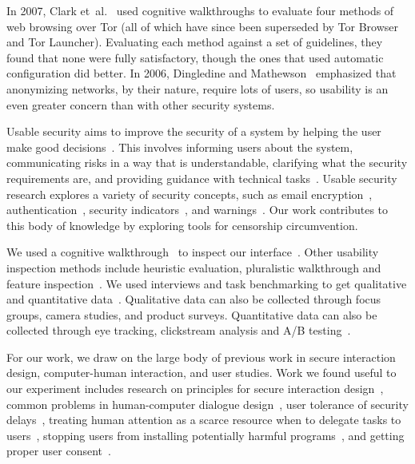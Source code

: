 \documentclass[USenglish,oneside,twocolumn]{article}
\begin{document}
In 2007, Clark et~al.~\cite{clark2007usability}
used cognitive walkthroughs to evaluate four
methods of web browsing over Tor
(all of which have since been superseded by Tor Browser and Tor Launcher).
Evaluating each method against a set of guidelines,
they found that none were fully satisfactory,
though the ones that used automatic configuration did better.
In 2006, Dingledine and Mathewson~\cite{dingledine2006anonymity}
emphasized that anonymizing networks, by their nature,
require lots of users, so usability is an even greater concern
than with other security systems.

Usable security aims to improve the security of a system by helping the user make good decisions~\cite{payne2008brief}. This involves informing users about the system, communicating risks in a way that is understandable, clarifying what the security requirements are, and providing guidance with technical tasks~\cite{adams1999users}. Usable security research explores a variety of security concepts, such as email encryption~\cite{whitten1999johnny,garfinkel2005johnny}, authentication~\cite{morris1979password,dhamija2000deja,suo2005graphical}, security indicators~\cite{dhamija2006phishing,akhawe2013alice}, and warnings~\cite{schechter2007emperor,egelman2008you}. Our work contributes to this body of knowledge by exploring tools for censorship circumvention.

We used a cognitive walkthrough~\cite{wharton1994cognitive,cognitive-walkthrough} to inspect our interface~\cite{nielsen1994usability}. Other usability inspection methods include heuristic evaluation, pluralistic walkthrough and feature inspection~\cite{inspection}. We used interviews and task benchmarking to get qualitative and quantitative data~\cite{krol2016towards}. Qualitative data can also be collected through focus groups, camera studies, and product surveys. Quantitative data can also be collected through eye tracking, clickstream analysis and A/B testing~\cite{ux-methods}. 
 
For our work, we draw on the large body of previous work in secure interaction design, computer-human interaction, and user studies. Work we found useful to our experiment includes research on principles for secure interaction design~\cite{yee2002user}, common problems in human-computer dialogue design~\cite{molich1990improving}, user tolerance of security delays~\cite{egelmanplease}, treating human attention as a scarce resource when to delegate tasks to users~\cite{bohme2011security}, stopping users from installing potentially harmful programs~\cite{good2007noticing}, and getting proper user consent~\cite{bohme2010trained}. 
\end{document}
